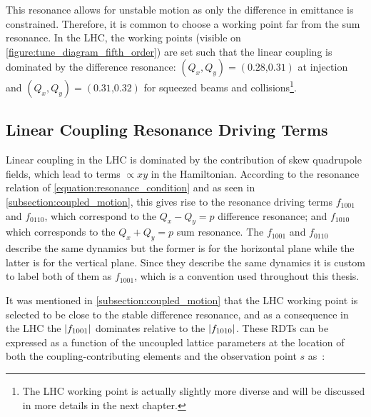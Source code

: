 This resonance allows for unstable motion as only the difference in emittance is constrained.
Therefore, it is common to choose a working point far from the sum resonance.
In the LHC, the working points (visible on \cref{figure:tune_diagram_fifth_order}) are set such that the linear coupling is dominated by the difference resonance: \((Q_x, Q_y) = (0.28 \text{,} 0.31)\) at injection and \((Q_x, Q_y) = (0.31 \text{,} 0.32)\) for squeezed beams and collisions\footnote{The LHC working point is actually slightly more diverse and will be discussed in more details in the next chapter.}.

\subsection{Linear Coupling Resonance Driving Terms}
\label{subsection:measurement_coupling_rdts}

Linear coupling in the LHC is dominated by the contribution of skew quadrupole fields, which lead to terms \(\propto xy\) in the Hamiltonian.
According to the resonance relation of \cref{equation:resonance_condition} and as seen in \cref{subsection:coupled_motion}, this gives rise to the resonance driving terms \(f_{1001}\) and \(f_{0110}\), which correspond to the \(Q_x - Q_y = p\) difference resonance; and \(f_{1010}\) which corresponds to the \(Q_x + Q_y = p\) sum resonance.
The \(f_{1001}\) and \(f_{0110}\) describe the same dynamics but the former is for the horizontal plane while the latter is for the vertical plane.
Since they describe the same dynamics it is custom to label both of them as \(f_{1001}\), which is a convention used throughout this thesis.

It was mentioned in \cref{subsection:coupled_motion} that the LHC working point is selected to be close to the stable difference resonance, and as a consequence in the LHC the \(\left\lvert f_{1001} \right\rvert\) dominates relative to the \(\left\lvert f_{1010} \right\rvert\).
These RDTs can be expressed as a function of the uncoupled lattice parameters at the location of both the coupling-contributing elements and the observation point \(s\) as~\cite{PHREV:Guignard:Betatron_Coupling_Radiation}:

